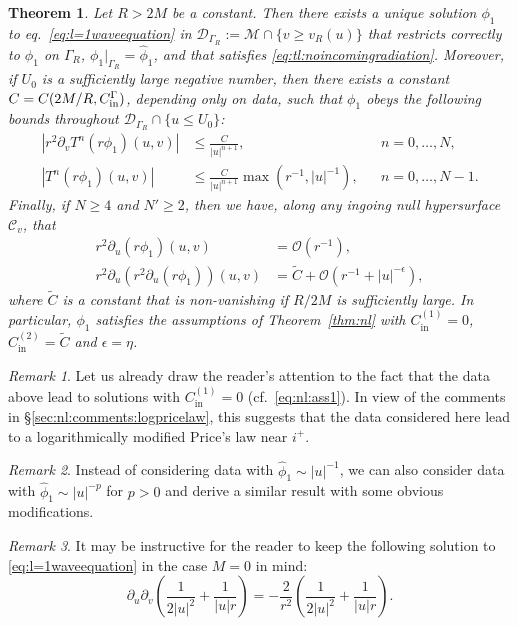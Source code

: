 \documentclass[11pt,english]{article}
\numberwithin{equation}{section}
\newtheorem{thm}{Theorem}[section]
\theoremstyle{remark}
\newtheorem{rem}{Remark}[section]
\theoremstyle{plain}
\theoremstyle{remark}
\newcommand{\pu}{\partial_u}
\newcommand{\pv}{\partial_v}
\renewcommand{\(}{\left(}
\renewcommand{\)}{\right)}
\newcommand{\cc}{C_{\mathrm{in}}^{(1)}}
\newcommand{\ccc}{C_{\mathrm{in}}^{(2)}}
\newcommand{\pho}{(r\phi_1)}
\begin{document}
\begin{thm}\label{thm:tl}
Let $R>2M$ be a constant. Then there exists a unique solution $\phi_1$ to eq.\ \eqref{eq:l=1waveequation} in $\mathcal{D}_{\Gamma_R}:=\mathcal{M}\cap\{v\geq v_R(u)\}$ that restricts correctly to $\hat{\phi}_1$ on $\Gamma_R$, $\phi_1|_{\Gamma_R}=\hat{\phi}_1$, and that satisfies \eqref{eq:tl:noincomingradiation}.
Moreover, if $U_0$ is a sufficiently large negative number, then there exists a constant $C=C(2M/R,C_{\mathrm{in}}^\Gamma)$, depending only on data, such that $\phi_1$ obeys the following bounds throughout $\mathcal{D}_{\Gamma_R}\cap\{u\leq U_0\}$:
\begin{align}\label{eq:thm5.5}
\left|r^2\pv T^n(r\phi_1)(u,v)\right|&\leq \frac{C}{|u|^{n+1}},&&n=0,\dots,N,\\
\left|T^n(r\phi_1)(u,v)\right|&\leq \frac{C}{|u|^{n+1}}\max\left(r^{-1},|u|^{-1}\right),&&n=0,\dots,N-1.%
\end{align}
Finally, if  $N\geq 4$ and $N'\geq 2$, then we have, along any ingoing null hypersurface $\mathcal{C}_v$, that
\begin{align}
r^2\pu(r\phi_1)(u,v)&=\mathcal{O}(r^{-1}),\\
r^2\pu(r^2\pu\pho)(u,v)&=\tilde{C}+\mathcal{O}(r^{-1}+|u|^{-\epsilon}),\label{eq:tl:thm:limit}
\end{align}
where $\tilde{C}$ is a constant that is non-vanishing if $R/2M$ is sufficiently large. 
In particular, $\phi_1$ satisfies the assumptions of Theorem~\ref{thm:nl} with $\cc=0$, $\ccc=\tilde{C}$ and $\epsilon=\eta$.
\end{thm}
\begin{rem}
Let us already draw the reader's attention to the fact that the data above lead to solutions with $\cc=0$ (cf.\ \eqref{eq:nl:ass1}). In view of the comments in \S\ref{sec:nl:comments:logpricelaw}, this suggests that the data considered here lead to a logarithmically modified Price's law near $i^+$. 
\end{rem}
\begin{rem}
Instead of considering data with $\hat{\phi}_1\sim|u|^{-1}$, we can also consider data with $\hat{\phi}_1\sim|u|^{-p}$ for $p>0$ and derive a similar result with some obvious modifications.
\end{rem}
\begin{rem}
It may be instructive for the reader to keep the following solution to \eqref{eq:l=1waveequation} in the case $M=0$ in mind:
\begin{equation}\label{eq:tl:examplesolution}
\pu\pv\left(\frac{1}{2|u|^2}+\frac{1}{|u|r}\right)=-\frac{2}{r^2}\left(\frac{1}{2|u|^2}+\frac{1}{|u|r}\right).
\end{equation}
\end{rem}
\end{document}
